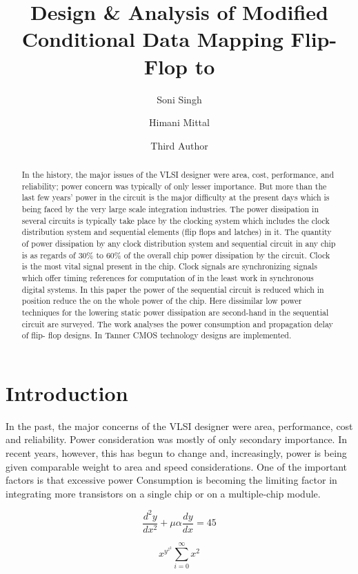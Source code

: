 \documentclass{article}
\title{Design \& Analysis of Modified Conditional Data
	Mapping Flip-Flop to }
\author{Soni Singh \and Himani Mittal \and Third Author 
}
\begin{document}
	
	\maketitle
	
	 \begin{abstract}
 	
 	In the history, the major issues of the VLSI designer were area, cost, performance, and reliability; power concern was
 	typically of only lesser
 	importance. But more than the last few years’ power in the circuit is the major difficulty at the present days which
 	is being faced by the very large scale integration industries. The power dissipation in 
 	several circuits is typically take place by the
 	clocking system which includes the clock distribution system and sequential elements (flip flops and latches) in it. The quantity of power
 	dissipation by any clock distribution system and sequential circuit in any chip is as regards of 30\% to 60\% of the overall chip power
 	dissipation by the 
 	circuit. Clock is the most vital signal present in the chip. Clock signals are synchronizing signals which offer timing
 	references 
 	for computation of in the least work in synchronous digital systems. In this paper the power of the sequential circuit is 
 	reduced which in position reduce the on the whole power of the chip. Here dissimilar low power techniques for the lowering static power
 	dissipation are second-hand in the sequential circuit are surveyed. The work analyses the power consumption and propagation delay of flip- flop designs. In Tanner CMOS technology designs are implemented.
 	
	 \end{abstract}
	
\section{Introduction}	
	In the past, the major concerns of the VLSI designer were
	area, performance, cost and reliability. Power consideration
	was mostly of only secondary importance. In recent years,
	however, this has begun to change and, increasingly, power
	is being given comparable weight to area and speed
	considerations. One of the important factors is that excessive
	power Consumption is becoming the limiting factor in integrating
	more transistors on a single chip or on a multiple-chip
	module. 
	
	\[
	\frac{d^2y}{dx^2} + \mu \alpha \frac{dy}{dx}  = 45
		\]
	
	\[ x^{y^{z^2}}  \sum_{i=0}^{\infty} x^2\]
	
\end{document}
